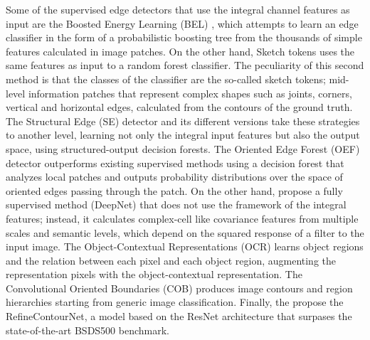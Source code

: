 \documentclass[journal]{IEEEtran}
\begin{document}
Some of the supervised edge detectors that use the integral channel features as input are the Boosted Energy Learning (BEL) \cite{Dollar.ZhuowenTu.ea:CVPR:2006}, which attempts to learn an edge classifier in the form of a probabilistic boosting tree from the thousands of simple features calculated in image patches. On the other hand, Sketch tokens \cite{Lim.Zitnick.ea:CVPR:2013} uses the same features as input to a random forest classifier. The peculiarity of this second method is that the classes of the classifier are the so-called sketch tokens; mid-level information patches that represent complex shapes such as joints, corners, vertical and horizontal edges, calculated from the contours of the ground truth. The Structural Edge (SE) detector \cite{Dollar.Zitnick:ICCV:2013} and its different versions \cite{Dollar.Zitnick:PAMI:2015} take these strategies to another level, learning not only the integral input features but also the output space, using structured-output decision forests. The Oriented Edge Forest (OEF) detector \cite{Hallman.Fowlkes:CVPR:2015} outperforms existing supervised methods using a decision forest that analyzes local patches and outputs probability distributions over the space of oriented edges passing through the patch. On the other hand, \cite{Kivinen.Williams.ea:PMLR:2014} propose a fully supervised method (DeepNet) that does not use the framework of the integral features; instead, it calculates complex-cell like covariance features from multiple scales and semantic levels, which depend on the squared response of a filter to the input image. The Object-Contextual Representations (OCR) \cite{Yuan.Chen.ea:arXiv:2021} learns object regions and the relation between each pixel and each object region, augmenting the representation pixels with the object-contextual representation. The Convolutional Oriented Boundaries (COB) \cite{Maninis.Pont-Tuset.ea:ECCV:2016, Maninis.Pont-Tuset.ea:PAMI:2018} produces image contours and region hierarchies starting from generic image classification. Finally, the \cite{Kelm.Rao.ea:CAIP:2019} propose the RefineContourNet, a model based on the ResNet architecture that surpases the state-of-the-art BSDS500 benchmark. 
\end{document}
